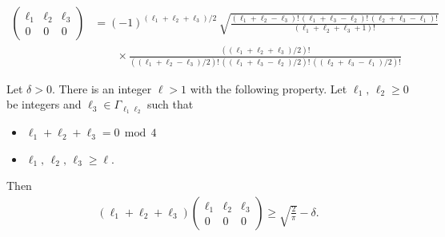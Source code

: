 \documentclass[10pt,a4paper]{amsart}
\begin{document}
\begin{equation} \label{wigner even}
	\begin{aligned}  
		\begin{pmatrix} \ell_1 & \ell_2 &\ell_3 \\
			0& 0 & 0
		\end{pmatrix}&=(-1)^{(\ell_1+\ell_2+\ell_3)/2}\,\sqrt{\frac{(\ell_1+\ell_2-\ell_3)!\,(\ell_1+\ell_3-\ell_2)!\,(\ell_2+\ell_3-\ell_1)!}{(\ell_1+\ell_2+\ell_3+1)!}}\, \\
		&\qquad \times  \frac{((\ell_1+\ell_2+\ell_3)/2)!}{((\ell_1+\ell_2-\ell_3)/2)!\,((\ell_1+\ell_3-\ell_2)/2)!\,((\ell_2+\ell_3-\ell_1)/2)!}
	\end{aligned}
\end{equation} 

\begin{lemma}  \label{3j lower bound} Let $\delta>0$. There is an integer $\ell>1$ with the following property. Let $\ell_1,\,\ell_2\geq0$ be integers and $\ell_3\in \Gamma_{\ell_1\ell_2}$ such that
	\begin{itemize}
		\item[$\circ$] $\ell_1+\ell_2+\ell_3=0\, \operatorname{mod}\, 4$ 
		\item[$\circ$] $\ell_1,\,\ell_2,\,\ell_3\geq \ell.$
	\end{itemize}
	Then 
	\begin{align*} 
		(\ell_1+\ell_2+\ell_3)\begin{pmatrix} \ell_1 & \ell_2 &\ell_3 \\
			0& 0 & 0
		\end{pmatrix}\geq \sqrt{\frac{2}{\pi}}-\delta.
	\end{align*} 
\end{lemma} 
\end{document}
